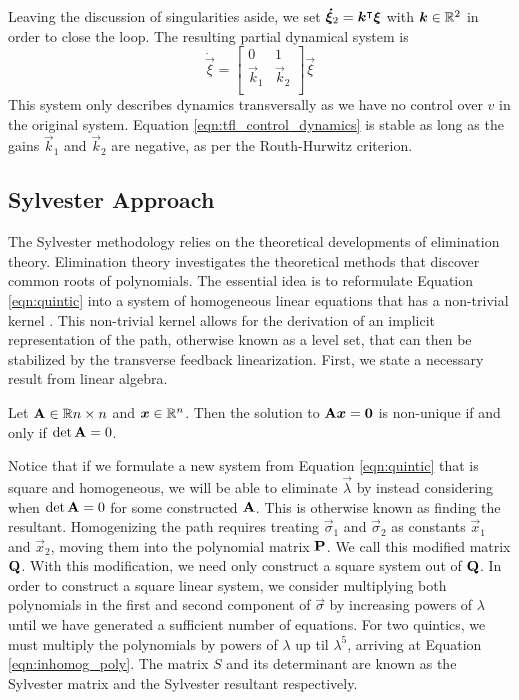 \documentclass[oneside, 11pt]{book}
\begin{document}
Leaving the discussion of singularities aside, we set $\bm{\dot{\xi}}_2 = {\bm{k}}^{\intercal}\bm{\xi}$ with $\bm{k}\in\mathbb{R}^2$ in order to close the loop. The resulting partial dynamical system is
\begin{equation}
    \dot{\vec{\xi}}
    =
    \begin{bmatrix}
        0 & 1\\
        \vec{k}_1 & \vec{k}_2 \\
    \end{bmatrix}
    \vec{\xi}
    \label{eqn:tfl_control_dynamics}
\end{equation}
This system only describes dynamics transversally as we have no control over $v$ in the original system. Equation \ref{eqn:tfl_control_dynamics} is stable as long as the gains $\vec{k}_1$ and $\vec{k}_2$ are negative, as per the Routh-Hurwitz criterion.

\subsection{Sylvester Approach}
The Sylvester methodology relies on the theoretical developments of elimination theory. Elimination theory investigates the theoretical methods that discover common roots of polynomials. The essential idea is to reformulate Equation \ref{eqn:quintic} into a system of homogeneous linear equations that has a non-trivial kernel \cite{Sederberg84}. This non-trivial kernel allows for the derivation of an implicit representation of the path, otherwise known as a level set, that can then be stabilized by the transverse feedback linearization. First, we state a necessary result from linear algebra.

\begin{theorem}
    Let $\mathbf{A}\in\mathbb{R}{n\times n}$ and $\bm{x}\in\mathbb{R}^n$. Then the solution to $\mathbf{A}\bm{x}=\bm{0}$ is non-unique if and only if $\det\mathbf{A}=0$. \label{thm:kernel}
\end{theorem}

Notice that if we formulate a new system from Equation \ref{eqn:quintic} that is square and homogeneous, we will be able to eliminate $\vec{\lambda}$ by instead considering when $\det\mathbf{A}=0$ for some constructed $\mathbf{A}$. This is otherwise known as finding the resultant\cite{Sederberg84}. Homogenizing the path requires treating $\vec{\sigma}_1$ and $\vec{\sigma}_2$ as constants $\vec{x}_1$ and $\vec{x}_2$, moving them into the polynomial matrix $\mathbf{P}$. We call this modified matrix $\mathbf{Q}$. With this modification, we need only construct a square system out of $\mathbf{Q}$. In order to construct a square linear system, we consider multiplying both polynomials in the first and second component of $\vec{\sigma}$ by increasing powers of $\lambda$ until we have generated a sufficient number of equations. For two quintics, we must multiply the polynomials by powers of $\lambda$ up til $\lambda^5$, arriving at Equation \ref{eqn:inhomog_poly}. The matrix $S$ and its determinant are known as the Sylvester matrix and the Sylvester resultant respectively.
\end{document}
